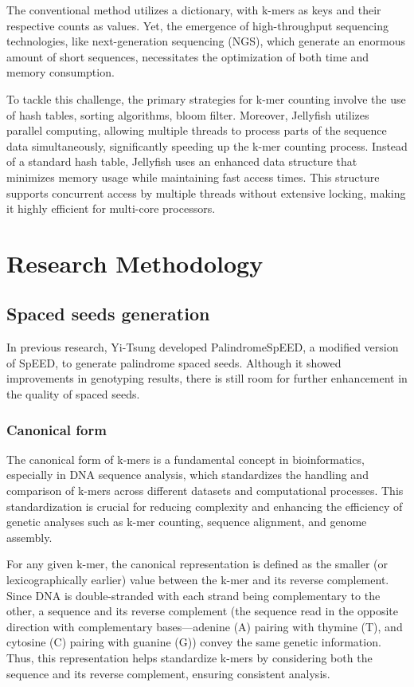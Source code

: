 \documentclass[PhD]{PHlab-thesis}
\begin{document}
The conventional method utilizes a dictionary, with k-mers as keys and their respective counts as values. Yet, the emergence of high-throughput sequencing technologies, like next-generation sequencing (NGS), which generate an enormous amount of short sequences, necessitates the optimization of both time and memory consumption.

To tackle this challenge, the primary strategies for k-mer counting involve the use of hash tables, sorting algorithms, bloom filter. Moreover, Jellyfish utilizes parallel computing, allowing multiple threads to process parts of the sequence data simultaneously, significantly speeding up the k-mer counting process. Instead of a standard hash table, Jellyfish uses an enhanced data structure that minimizes memory usage while maintaining fast access times. This structure supports concurrent access by multiple threads without extensive locking, making it highly efficient for multi-core processors.

\chapter{Research Methodology}
\section{Spaced seeds generation}
In previous research, Yi-Tsung developed PalindromeSpEED, a modified version of SpEED, to generate palindrome spaced seeds. Although it showed improvements in genotyping results, there is still room for further enhancement in the quality of spaced seeds.

\subsection{Canonical form}
The canonical form of k-mers is a fundamental concept in bioinformatics, especially in DNA sequence analysis, which standardizes the handling and comparison of k-mers across different datasets and computational processes. This standardization is crucial for reducing complexity and enhancing the efficiency of genetic analyses such as k-mer counting, sequence alignment, and genome assembly.

For any given k-mer, the canonical representation is defined as the smaller (or lexicographically earlier) value between the k-mer and its reverse complement. Since DNA is double-stranded with each strand being complementary to the other, a sequence and its reverse complement (the sequence read in the opposite direction with complementary bases—adenine (A) pairing with thymine (T), and cytosine (C) pairing with guanine (G)) convey the same genetic information. Thus, this representation helps standardize k-mers by considering both the sequence and its reverse complement, ensuring consistent analysis.
\vspace{2em}
\end{document}
